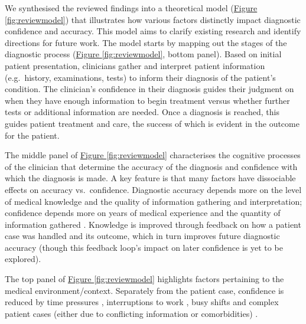 \documentclass[a4paper, nobind]{templates/ociamthesis}
\begin{document}
We synthesised the reviewed findings into a theoretical model (\hyperref[fig:reviewmodel]{Figure \ref{fig:reviewmodel}}) that illustrates how various factors distinctly impact diagnostic confidence and accuracy. This model aims to clarify existing research and identify directions for future work. The model starts by mapping out the stages of the diagnostic process (\hyperref[fig:reviewmodel]{Figure \ref{fig:reviewmodel}}, bottom panel). Based on initial patient presentation, clinicians gather and interpret patient information (e.g.~history, examinations, tests) to inform their diagnosis of the patient's condition. The clinician's confidence in their diagnosis guides their judgment on when they have enough information to begin treatment versus whether further tests or additional information are needed. Once a diagnosis is reached, this guides patient treatment and care, the success of which is evident in the outcome for the patient.

\hfill\break
The middle panel of \hyperref[fig:reviewmodel]{Figure \ref{fig:reviewmodel}} characterises the cognitive processes of the clinician that determine the accuracy of the diagnosis and confidence with which the diagnosis is made. A key feature is that many factors have dissociable effects on accuracy vs.~confidence. Diagnostic accuracy depends more on the level of medical knowledge and the quality of information gathering and interpretation; confidence depends more on years of medical experience and the quantity of information gathered \autocite{kostopoulou_information_2012,hautz_accuracy_2019,mamede_role_2024}. Knowledge is improved through feedback on how a patient case was handled and its outcome, which in turn improves future diagnostic accuracy (though this feedback loop's impact on later confidence is yet to be explored).

\hfill\break
The top panel of \hyperref[fig:reviewmodel]{Figure \ref{fig:reviewmodel}} highlights factors pertaining to the medical environment/context. Separately from the patient case, confidence is reduced by time pressures \autocite{yang_effect_2012}, interruptions to work \autocite{soares_accuracy_2019}, busy shifts \autocite{gupta_associations_2023} and complex patient cases (either due to conflicting information or comorbidities) \autocite{meyer_physicians_2013,hausmann_sensitivity_2019,li_relationship_2023}.
\end{document}
